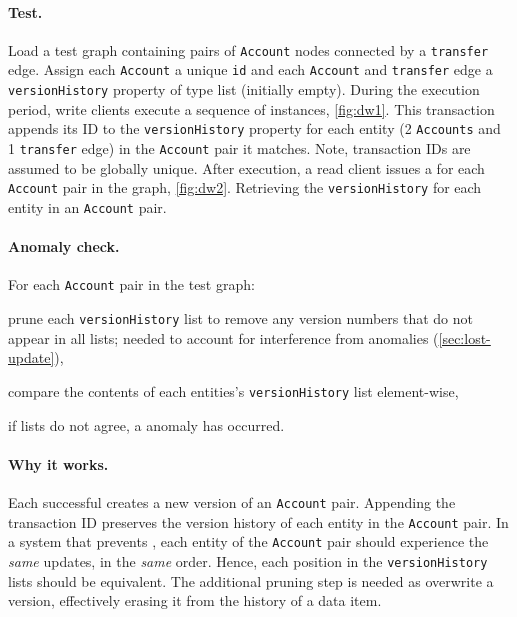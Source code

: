 \paragraph{Test.}
Load a test graph containing pairs of \texttt{Account} nodes connected by a 
\texttt{transfer} edge. Assign each \texttt{Account} a unique \texttt{id} and 
each \texttt{Account} and \texttt{transfer} edge a \texttt{versionHistory} 
property of type list (initially empty). During the execution period, write 
clients execute a sequence of  instances, \autoref{fig:dw1}.
This transaction appends its ID to the \texttt{versionHistory} property for each 
entity (2 \texttt{Accounts} and 1 \texttt{transfer} edge) in the \texttt{Account}
pair it matches. Note, transaction IDs are assumed to be globally unique. After 
execution, a read client issues a  for each 
\texttt{Account} pair in the graph, \autoref{fig:dw2}. Retrieving the 
\texttt{versionHistory} for each entity in an \texttt{Account} pair.

\paragraph{Anomaly check.}
For each \texttt{Account} pair in the test graph:
\begin{enumerate*}[label={(\roman*)}]
  \item prune each \texttt{versionHistory} list to remove any version numbers 
        that do not appear in all lists; needed to account for interference from
         anomalies (\autoref{sec:lost-update}),
  \item compare the contents of each entities's \texttt{versionHistory} list
        element-wise,
  \item if lists do not agree, a  anomaly has occurred.

\end{enumerate*}

\paragraph{Why it works.}
Each successful  creates a new version of an 
\texttt{Account} pair. Appending the transaction ID preserves the version 
history of each entity in the \texttt{Account} pair. In a system that prevents 
, each entity of the \texttt{Account} pair should experience the 
\emph{same} updates, in the \emph{same} order. Hence, each position in the 
\texttt{versionHistory} lists should be equivalent. The additional pruning step 
is needed as  overwrite a version, effectively erasing it 
from the history of a data item.


